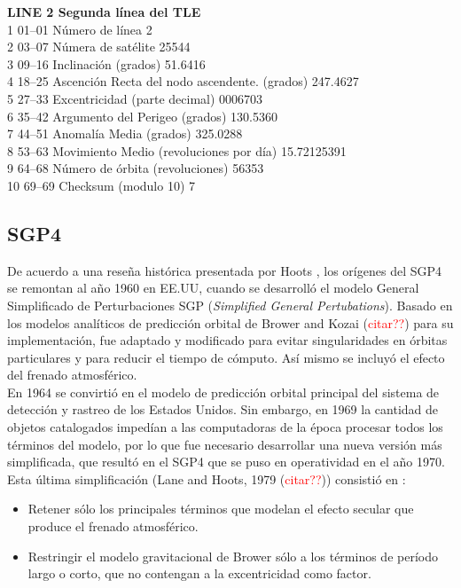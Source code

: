 \begin{center}
{{{\bf{LINE 2 Segunda l\'inea del TLE}}\\
1   01–01   Número de línea    2\\
2   03–07   Númera de satélite 25544\\
3   09–16   Inclinación (grados)     51.6416\\
4   18–25   Ascención Recta del nodo ascendente. (grados)   247.4627\\
5   27–33   Excentricidad (parte decimal)  0006703\\
6   35–42   Argumento del Perigeo (grados) 130.5360\\
7   44–51   Anomalía Media (grados) 325.0288\\
8   53–63   Movimiento Medio (revoluciones por día) 15.72125391\\
9   64–68   Número de órbita (revoluciones)  56353\\
10  69–69   Checksum (modulo 10)  7\\
}}
\end{center}

\subsection{SGP4}\label{subsec:sgp4model}
De acuerdo a una rese\~na hist\'orica presentada por Hoots \citep{hootshistoria}, los or\'igenes del SGP4 se remontan al a\~no 1960 en EE.UU, cuando se desarroll\'o el modelo General Simplificado de Perturbaciones SGP  ({\it{Simplified General Pertubations}}). Basado en los modelos anal\'iticos de predicci\'on orbital de Brower and Kozai (\textcolor{red}{citar??}) para su implementaci\'on, fue adaptado y modificado para evitar singularidades en \'orbitas particulares y para reducir el tiempo de c\'omputo. As\'i mismo se incluy\'o el efecto del frenado atmosf\'erico.\\
En 1964 se convirti\'o en el modelo de predicci\'on orbital principal del sistema de detecci\'on y rastreo de los Estados Unidos.
Sin embargo, en 1969 la cantidad de objetos catalogados imped\'ian a las computadoras de la \'epoca procesar todos los t\'erminos del modelo, por lo que fue necesario desarrollar una nueva versi\'on m\'as simplificada, que result\'o en el SGP4 que se puso en operatividad en el a\~no 1970.\\

Esta \'ultima simplificaci\'on (Lane and Hoots, 1979 (\textcolor{red}{citar??})) consisti\'o en :\\
\begin{itemize}
 \item Retener s\'olo los principales t\'erminos que modelan el efecto secular que produce el frenado atmosf\'erico.
 \item Restringir el modelo gravitacional de Brower s\'olo a los t\'erminos de per\'iodo largo o corto, que no contengan a la excentricidad como factor.
\end{itemize}

